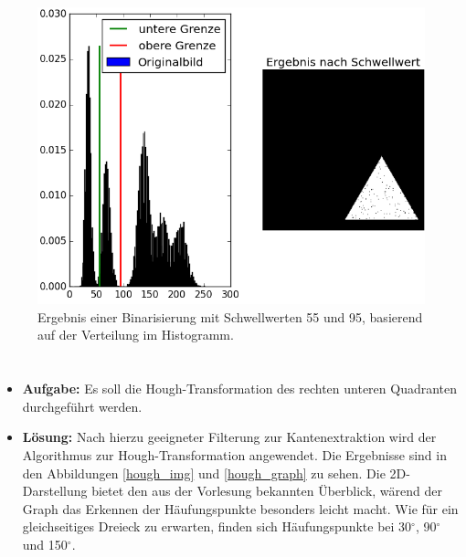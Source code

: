 \documentclass[12pt, a4paper, twoside]{report}
\begin{document}
\begin{figure}[h]
\centering
\includegraphics[width=\textwidth]{../bilder/schwellwert.png}
\caption{Ergebnis einer Binarisierung mit Schwellwerten 55 und 95, basierend auf der Verteilung im Histogramm.}
\label{schwellwert}
\end{figure}

\section{}
\begin{itemize}
\csname c@topnumber
\item \textbf{Aufgabe:} Es soll die Hough-Transformation des rechten unteren Quadranten durchgeführt werden.
\item \textbf{Lösung:} Nach hierzu geeigneter Filterung zur Kantenextraktion wird der Algorithmus zur Hough-Transformation angewendet. Die Ergebnisse sind in den Abbildungen \ref{hough_img} und \ref{hough_graph} zu sehen. Die 2D-Darstellung bietet den aus der Vorlesung bekannten Überblick, wärend der Graph das Erkennen der Häufungspunkte besonders leicht macht. Wie für ein gleichseitiges Dreieck zu erwarten, finden sich Häufungspunkte bei 30$^\circ$, 90$^\circ$ und 150$^\circ$.
\end{itemize}
\end{document}
